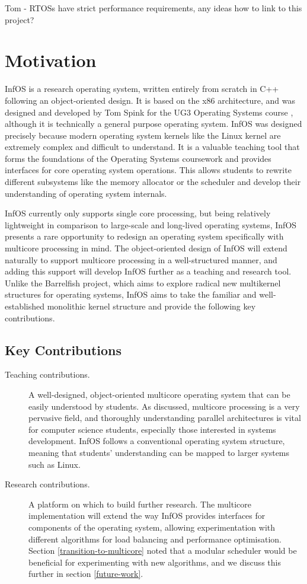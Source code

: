 \documentclass[bsc,frontabs,singlespacing,parskip,deptreport]{infthesis}
\begin{document}
Tom - RTOSs have strict performance requirements, any ideas how to link to this project?

\section{Motivation} \label{motivation}
InfOS \cite{infos} is a research operating system, written entirely from scratch in C++ following an object-oriented design. It is based on the x86 architecture, and was designed and developed by Tom Spink for the UG3 Operating Systems course \cite{ug3os}, although it is technically a general purpose operating system. InfOS was designed precisely because modern operating system kernels like the Linux kernel are extremely complex and difficult to understand. It is a valuable teaching tool that forms the foundations of the Operating Systems coursework and provides interfaces for core operating system operations. This allows students to rewrite different subsystems like the memory allocator or the scheduler and develop their understanding of operating system internals. 

InfOS currently only supports single core processing, but being relatively lightweight in comparison to large-scale and long-lived operating systems, InfOS presents a rare opportunity to redesign an operating system specifically with multicore processing in mind. The object-oriented design of InfOS will extend naturally to support multicore processing in a well-structured manner, and adding this support will develop InfOS further as a teaching and research tool. Unlike the Barrelfish project, which aims to explore radical new multikernel structures for operating systems, InfOS aims to take the familiar and well-established monolithic kernel structure and provide the following key contributions.

\subsection{Key Contributions} \label{key-contributions}
\begin{description}
    \item [Teaching contributions.] A well-designed, object-oriented multicore operating system that can be easily understood by students. As discussed, multicore processing is a very pervasive field, and thoroughly understanding parallel architectures is vital for computer science students, especially those interested in systems development. InfOS follows a conventional operating system structure, meaning that students' understanding can be mapped to larger systems such as Linux.
    \item [Research contributions.] A platform on which to build further research. The multicore implementation will extend the way InfOS provides interfaces for components of the operating system, allowing experimentation with different algorithms for load balancing and performance optimisation. Section \ref{transition-to-multicore} noted that a modular scheduler would be beneficial for experimenting with new algorithms, and we discuss this further in section \ref{future-work}.
\end{description}
\end{document}
